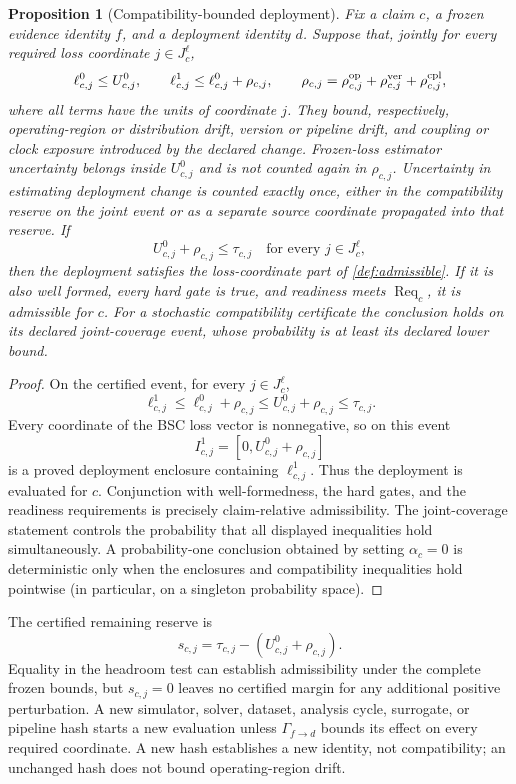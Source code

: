 \documentclass[11pt,a4paper]{article}
\theoremstyle{definition}
\theoremstyle{plain}
\newtheorem{proposition}[definition]{Proposition}
\theoremstyle{remark}
\begin{document}
\begin{proposition}[Compatibility-bounded deployment]
\label{prop:deploymentcompat}
Fix a claim \(c\), a frozen evidence identity \(f\), and a deployment identity
\(d\).  Suppose that, jointly for every required loss coordinate
\(j\in J_c^\ell\),
\[
\ell_{c,j}^{0}\le U^0_{c,j},
\qquad
\ell_{c,j}^{1}\le\ell_{c,j}^{0}+\rho_{c,j},
\qquad
\rho_{c,j}
=\rho_{c,j}^{\rm op}+\rho_{c,j}^{\rm ver}
+\rho_{c,j}^{\rm cpl},
\]
where all terms have the units of coordinate \(j\).  They bound,
respectively, operating-region or distribution drift, version or pipeline
drift, and coupling or clock exposure introduced by the declared change.
Frozen-loss estimator uncertainty belongs inside \(U^0_{c,j}\) and is not
counted again in \(\rho_{c,j}\).  Uncertainty in estimating deployment change
is counted exactly once, either in the compatibility reserve on the joint
event or as a separate source coordinate propagated into that reserve.  If
\[
U^0_{c,j}+\rho_{c,j}\le\tau_{c,j}
\quad\text{for every }j\in J_c^\ell,
\]
then the deployment satisfies the loss-coordinate part of
\cref{def:admissible}.  If it is also well formed, every hard gate is true,
and readiness meets \(\operatorname{Req}_c\), it is admissible for \(c\).
For a stochastic compatibility certificate the conclusion holds on its
declared joint-coverage event, whose probability is at least its declared
lower bound.
\end{proposition}
\begin{proof}
On the certified event, for every \(j\in J_c^\ell\),
\[
\ell_{c,j}^{1}
\le\ell_{c,j}^{0}+\rho_{c,j}
\le U^0_{c,j}+\rho_{c,j}
\le\tau_{c,j}.
\]
Every coordinate of the BSC loss vector is nonnegative, so on this event
\[
I^1_{c,j}=[0,U^0_{c,j}+\rho_{c,j}]
\]
is a proved deployment enclosure containing \(\ell^1_{c,j}\).  Thus the
deployment is evaluated for \(c\).  Conjunction with well-formedness, the
hard gates, and the readiness requirements is precisely claim-relative
admissibility.  The joint-coverage statement controls the probability that
all displayed inequalities hold simultaneously.  A probability-one
conclusion obtained by setting
\(\alpha_c=0\) is deterministic only when the enclosures and compatibility
inequalities hold pointwise (in particular, on a singleton probability
space).
\end{proof}

The certified remaining reserve is
\[
s_{c,j}=\tau_{c,j}-(U^0_{c,j}+\rho_{c,j}).
\]
Equality in the headroom test can establish admissibility under the complete
frozen bounds, but \(s_{c,j}=0\) leaves no certified margin for any additional
positive perturbation.  A new simulator, solver, dataset, analysis cycle,
surrogate, or pipeline hash starts a new evaluation unless
\(\Gamma_{f\to d}\) bounds its effect on every required coordinate.  A new
hash establishes a new identity, not compatibility; an unchanged hash does
not bound operating-region drift.
\end{document}
